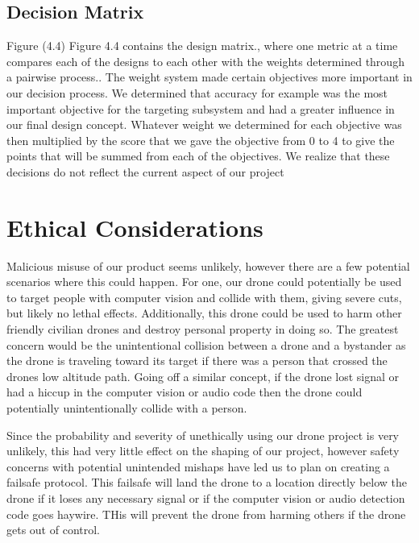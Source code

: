 \documentclass[10pt]{article}
\begin{document}
\subsection{Decision Matrix}
%
%
%
%
Figure (4.4)
Figure 4.4 contains the design matrix., where one metric at a time compares each of the designs to each other with the weights determined through a pairwise process.. The weight system made certain objectives more important in our decision process.  We determined that accuracy for example was the most important objective for the targeting subsystem and had a greater influence in our final design concept.  Whatever weight we determined for each objective was then multiplied by the score that we gave the objective from 0 to 4 to give the points that will be summed from each of the objectives. We realize that these decisions do not reflect the current aspect of our project

\section{Ethical Considerations}
Malicious misuse of our product seems unlikely, however there are a few potential scenarios where this could happen.  For one, our drone could potentially be used to target people with computer vision and collide with them, giving severe cuts, but likely no lethal effects.  Additionally, this drone could be used to harm other friendly civilian drones and destroy personal property in doing so.  The greatest concern would be the unintentional collision between a drone and a bystander as the drone is traveling toward its target if there was a person that crossed the drones low altitude path.  Going off a similar concept, if the drone lost signal or had a hiccup in the computer vision or audio code then the drone could potentially unintentionally collide with a person.  
 
Since the probability and severity of unethically using our drone project is very unlikely, this had very little effect on the shaping of our project, however safety concerns with potential unintended mishaps have led us to plan on creating a failsafe protocol.  This failsafe will land the drone to a location directly below the drone if it loses any necessary signal or if the computer vision or audio detection code goes haywire.  THis will prevent the drone from harming others if the drone gets out of control.  
\end{document}
